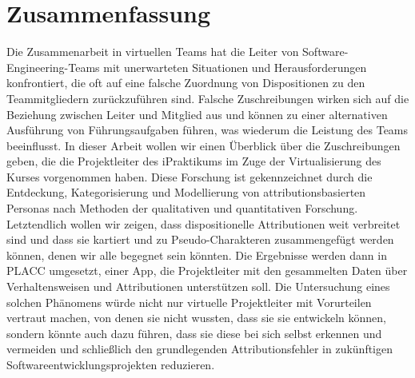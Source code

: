 \chapter{Zusammenfassung}


Die Zusammenarbeit in virtuellen Teams hat die Leiter von Software-Engineering-Teams mit unerwarteten Situationen und Herausforderungen konfrontiert, die oft auf eine falsche Zuordnung von Dispositionen zu den Teammitgliedern zurückzuführen sind.  Falsche Zuschreibungen wirken sich auf die Beziehung zwischen Leiter und Mitglied aus und können zu einer alternativen Ausführung von Führungsaufgaben führen, was wiederum die Leistung des Teams beeinflusst.   In dieser Arbeit wollen wir einen Überblick über die Zuschreibungen geben, die die Projektleiter des iPraktikums im Zuge der Virtualisierung des Kurses vorgenommen haben.   Diese Forschung ist gekennzeichnet durch die Entdeckung, Kategorisierung und Modellierung von attributionsbasierten Personas nach Methoden der qualitativen und quantitativen Forschung. Letztendlich wollen wir zeigen, dass dispositionelle Attributionen weit verbreitet sind und dass sie kartiert und zu Pseudo-Charakteren zusammengefügt werden können, denen wir alle begegnet sein könnten.  Die Ergebnisse werden dann in PLACC umgesetzt, einer App, die Projektleiter mit den gesammelten Daten über Verhaltensweisen und Attributionen unterstützen soll.  Die Untersuchung eines solchen Phänomens würde nicht nur virtuelle Projektleiter mit Vorurteilen vertraut machen, von denen sie nicht wussten, dass sie sie entwickeln können, sondern könnte auch dazu führen, dass sie diese bei sich selbst erkennen und vermeiden und schließlich den grundlegenden Attributionsfehler in zukünftigen Softwareentwicklungsprojekten reduzieren.